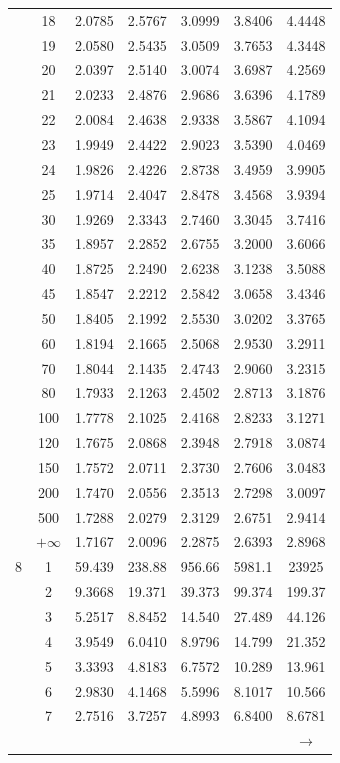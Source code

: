 \begin{minipage}{0.49\textwidth}
\begin{center}
\begin{tabular}{ccccccc}
			& 18 & 2.0785 & 2.5767 & 3.0999 & 3.8406 & 4.4448 \\
			& 19 & 2.0580 & 2.5435 & 3.0509 & 3.7653 & 4.3448 \\[5pt]
			& 20 & 2.0397 & 2.5140 & 3.0074 & 3.6987 & 4.2569 \\
			& 21 & 2.0233 & 2.4876 & 2.9686 & 3.6396 & 4.1789 \\
			& 22 & 2.0084 & 2.4638 & 2.9338 & 3.5867 & 4.1094 \\
			& 23 & 1.9949 & 2.4422 & 2.9023 & 3.5390 & 4.0469 \\
			& 24 & 1.9826 & 2.4226 & 2.8738 & 3.4959 & 3.9905 \\
			& 25 & 1.9714 & 2.4047 & 2.8478 & 3.4568 & 3.9394 \\
			& 30 & 1.9269 & 2.3343 & 2.7460 & 3.3045 & 3.7416 \\
			& 35 & 1.8957 & 2.2852 & 2.6755 & 3.2000 & 3.6066 \\
			& 40 & 1.8725 & 2.2490 & 2.6238 & 3.1238 & 3.5088 \\
			& 45 & 1.8547 & 2.2212 & 2.5842 & 3.0658 & 3.4346 \\[5pt]
			& 50 & 1.8405 & 2.1992 & 2.5530 & 3.0202 & 3.3765 \\
			& 60 & 1.8194 & 2.1665 & 2.5068 & 2.9530 & 3.2911 \\
			& 70 & 1.8044 & 2.1435 & 2.4743 & 2.9060 & 3.2315 \\
			& 80 & 1.7933 & 2.1263 & 2.4502 & 2.8713 & 3.1876 \\
			& 100 & 1.7778 & 2.1025 & 2.4168 & 2.8233 & 3.1271 \\
			& 120 & 1.7675 & 2.0868 & 2.3948 & 2.7918 & 3.0874 \\
			& 150 & 1.7572 & 2.0711 & 2.3730 & 2.7606 & 3.0483 \\
			& 200 & 1.7470 & 2.0556 & 2.3513 & 2.7298 & 3.0097 \\
			& 500 & 1.7288 & 2.0279 & 2.3129 & 2.6751 & 2.9414 \\
			& $+\infty$ & 1.7167 & 2.0096 & 2.2875 & 2.6393 & 2.8968 \\
			\midrule
			8 & 1 & 59.439 & 238.88 & 956.66 & 5981.1 & 23925 \\
			& 2 & 9.3668 & 19.371 & 39.373 & 99.374 & 199.37 \\
			& 3 & 5.2517 & 8.8452 & 14.540 & 27.489 & 44.126 \\
			& 4 & 3.9549 & 6.0410 & 8.9796 & 14.799 & 21.352 \\
			& 5 & 3.3393 & 4.8183 & 6.7572 & 10.289 & 13.961 \\
			& 6 & 2.9830 & 4.1468 & 5.5996 & 8.1017 & 10.566 \\
			& 7 & 2.7516 & 3.7257 & 4.8993 & 6.8400 & 8.6781 \\
			&  &  &  &  &  & $\rightarrow$ \\
		\end{tabular}
	\end{center}
\end{minipage}

